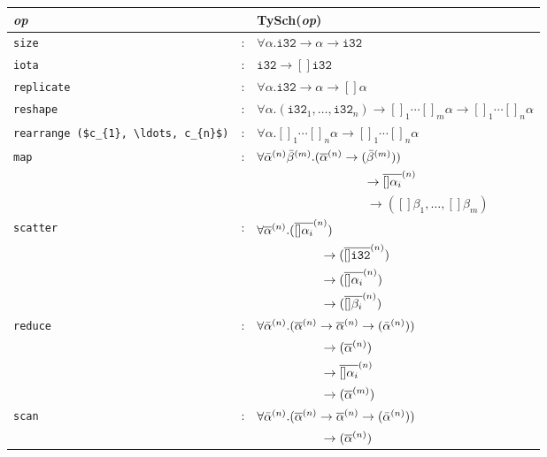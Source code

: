 \begin{figure}[hbt]
\begin{tabular}{lcl}
\emph{op} & & \textrm{TySch}(\emph{op}) \\ \hline
  {\lstinline!size!} & : & $\forall\alpha.\texttt{i32} \rightarrow \alpha \rightarrow \texttt{i32}$ \\
  {\lstinline!iota!} & : & $\texttt{i32} \rightarrow []\texttt{i32}$ \\
  {\lstinline!replicate!} & : & $\forall\alpha.\texttt{i32} \rightarrow \alpha \rightarrow []\alpha$ \\
  \lstinline[mathescape]!reshape! & : & $\forall\alpha.(\texttt{i32}_{1}, \ldots, \texttt{i32}_{n})\rightarrow[]_{1}\cdots[]_{m}\alpha\rightarrow[]_{1}\cdots[]_{n}\alpha$ \\
  \lstinline[mathescape]!rearrange ($c_{1}, \ldots, c_{n}$)! & : & $\forall\alpha.[]_{1}\cdots[]_{n}\alpha\rightarrow[]_{1}\cdots[]_{n}\alpha$ \\
  {\lstinline!map!} & : & $\forall\bar{\alpha}^{(n)}\bar{\beta}^{(m)}. (\overline{\alpha}^{(n)} \rightarrow (\bar{\beta}^{(m)}))$ \\
          & & ~~~~~~~~~~~~~~~~~ $\rightarrow \overline{[]\alpha_i}^{(n)}$ \\
          & & ~~~~~~~~~~~~~~~~~ $\rightarrow ([]\beta_1,\ldots,[]\beta_m)$ \\
  {\lstinline!scatter!} & : & $\forall \overline{\alpha}^{(n)}.(\overline{[]\alpha_{i}}^{(n)})$\\
          & & ~~~~~~~~~~ $\rightarrow (\overline{[]\texttt{i32}}^{(n)})$\\
          & & ~~~~~~~~~~ $\rightarrow (\overline{[]\alpha_i}^{(n)})$\\
          & & ~~~~~~~~~~ $\rightarrow (\overline{[]\beta_i}^{(n)})$\\
  {\lstinline!reduce!} & : & $\forall\bar{\alpha}^{(n)}.(\overline{\alpha}^{(n)} \rightarrow \overline{\alpha}^{(n)} \rightarrow (\bar{\alpha}^{(n)}))$\\
          & & ~~~~~~~~~~ $\rightarrow (\overline{\alpha}^{(n)})$\\
          & & ~~~~~~~~~~ $\rightarrow \overline{[]\alpha_i}^{(n)}$\\
          & & ~~~~~~~~~~ $\rightarrow (\overline{\alpha}^{(m)})$ \\
  {\lstinline!scan!} & : & $\forall\bar{\alpha}^{(n)}.(\overline{\alpha}^{(n)} \rightarrow \overline{\alpha}^{(n)} \rightarrow (\bar{\alpha}^{(n)}))$\\
          & & ~~~~~~~~~~ $\rightarrow (\overline{\alpha}^{(n)})$\\

\end{tabular}
\end{figure}
